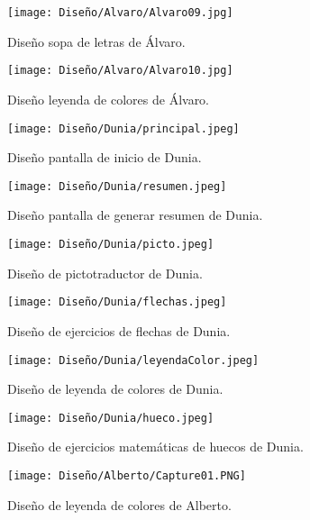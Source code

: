 \begin{figure}[ht!]
  \centering
  \texttt{[image: Diseño/Alvaro/Alvaro09.jpg]}
  \caption{Diseño sopa de letras de Álvaro.}
  \label{fig:disenyoAlvaro09}
\end{figure}

\begin{figure}[ht!]
  \centering
  \texttt{[image: Diseño/Alvaro/Alvaro10.jpg]}
  \caption{Diseño leyenda de colores de Álvaro.}
  \label{fig:disenyoAlvaro10}
\end{figure}

\begin{figure}[ht!]
  \centering
  \texttt{[image: Diseño/Dunia/principal.jpeg]}
  \caption{Diseño pantalla de inicio de Dunia.}
  \label{dunia1}
\end{figure}

\begin{figure}[ht!]
  \centering
  \texttt{[image: Diseño/Dunia/resumen.jpeg]}
  \caption{Diseño pantalla de generar resumen de Dunia.}
  \label{dunia2}
\end{figure}

\begin{figure}[ht!]
  \centering
  \texttt{[image: Diseño/Dunia/picto.jpeg]}
  \caption{Diseño de pictotraductor de Dunia.}
  \label{dunia3}
\end{figure}

\begin{figure}[ht!]
  \centering
  \texttt{[image: Diseño/Dunia/flechas.jpeg]}
  \caption{Diseño de ejercicios de flechas de Dunia.}
  \label{dunia4}
\end{figure}

\begin{figure}[ht!]
  \centering
  \texttt{[image: Diseño/Dunia/leyendaColor.jpeg]}
  \caption{Diseño de leyenda de colores de Dunia.}
  \label{dunia5}
\end{figure}

\begin{figure}[ht!]
  \centering
  \texttt{[image: Diseño/Dunia/hueco.jpeg]}
  \caption{Diseño de ejercicios matemáticas de huecos de Dunia.}
  \label{dunia6}
\end{figure}




\begin{figure}[ht!]
  \centering
\texttt{[image: Diseño/Alberto/Capture01.PNG]}
  \caption{Diseño de leyenda de colores de Alberto.}
  
  
\end{figure}

